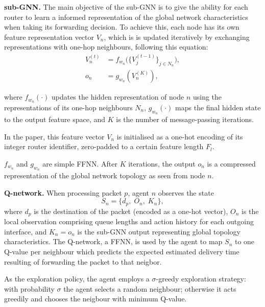 \documentclass[10pt,twocolumn,letterpaper]{article}
\begin{document}
\textbf{sub-GNN.} The main objective of the sub-GNN is to give the ability for each router to learn a informed representation of the global network characteristics when taking its forwarding decision. To achieve this, each node has its own
feature representation vector $V_n$, which is is updated iteratively by exchanging representations
with one-hop neighbours, following this equation:
\begin{align}
  V_n^{(t)} &= f_{w_n}\!\bigl(
    \{V_j^{(t-1)}\}_{j \in N_n}
  \bigr), \label{eq:gnn} \\
  o_n &= g_{w_n}(V_n^{(K)}), \label{eq:out}
\end{align}

where $f_{w_n}(\cdot)$ updates the hidden representation of node $n$
using the representations of its one-hop neighbours $N_n$,
$g_{w_n}(\cdot)$ maps the final hidden state to the output feature
space, and $K$ is the number of message-passing iterations.

In the paper, this feature vector $V_n$ is initialised as a one-hot encoding of its integer
router identifier, zero-padded to a certain feature length $F_l$.

$f_{w_n}$ and $g_{w_n}$ are simple FFNN. After $K$ iterations, the output $o_n$
is a compressed representation of the global network topology as seen
from node $n$.

\textbf{Q-network.} When processing packet $p$, agent $n$
observes the state
\begin{equation}
  S_n = \{d_p,\; O_n,\; K_n\},
  \label{eq:state}
\end{equation}
where $d_p$ is the destination of the packet (encoded as a one-hot
vector), $O_n$ is the local observation comprising queue lengths and
action history for each outgoing interface, and $K_n = o_n$ is the
sub-GNN output representing global topology characteristics. The
Q-network, a FFNN, is used by the agent to map $S_n$ to one Q-value per neighbour which predicts the expected estimated delivery time resulting of forwarding the packet to that neigbor.

\medskip
As the exploration policy, the agent employs a $\sigma$-greedy exploration strategy: with probability
$\sigma$ the agent selects a random neighbour; otherwise it acts
greedily and chooses the neigbour with minimum Q-value.
\end{document}
